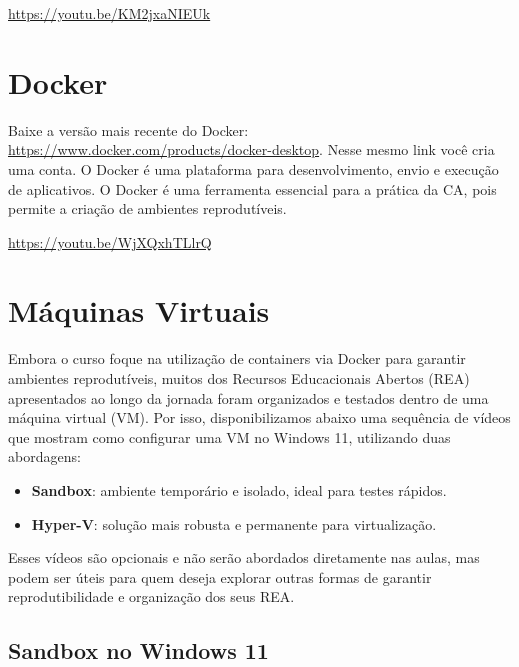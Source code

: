 \documentclass[
  a4paper,
]{book}
\providecommand{\tightlist}{%
  \setlength{\itemsep}{0pt}\setlength{\parskip}{0pt}}\usepackage{longtable,booktabs,array}
\begin{document}
\url{https://youtu.be/KM2jxaNIEUk}

\section*{Docker}\label{sec-dockerprework}


Baixe a versão mais recente do Docker:
\url{https://www.docker.com/products/docker-desktop}. Nesse mesmo link
você cria uma conta. O Docker é uma plataforma para desenvolvimento,
envio e execução de aplicativos. O Docker é uma ferramenta essencial
para a prática da CA, pois permite a criação de ambientes reprodutíveis.

\url{https://youtu.be/WjXQxhTLlrQ}

\section*{Máquinas Virtuais}\label{sec-vmprework}


Embora o curso foque na utilização de containers via Docker para
garantir ambientes reprodutíveis, muitos dos Recursos Educacionais
Abertos (REA) apresentados ao longo da jornada foram organizados e
testados dentro de uma máquina virtual (VM). Por isso, disponibilizamos
abaixo uma sequência de vídeos que mostram como configurar uma VM no
Windows 11, utilizando duas abordagens:

\begin{itemize}
\tightlist
\item
  \textbf{Sandbox}: ambiente temporário e isolado, ideal para testes
  rápidos.
\item
  \textbf{Hyper-V}: solução mais robusta e permanente para
  virtualização.
\end{itemize}

Esses vídeos são opcionais e não serão abordados diretamente nas aulas,
mas podem ser úteis para quem deseja explorar outras formas de garantir
reprodutibilidade e organização dos seus REA.

\subsection*{Sandbox no Windows 11}\label{sandbox-no-windows-11}
\end{document}
